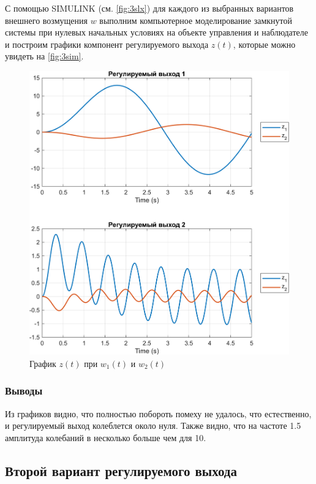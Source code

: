 С помощью SIMULINK (см. \autoref{fig:3slx}) для каждого из выбранных вариантов внешнего возмущения $w$ выполним 
компьютерное моделирование замкнутой системы при нулевых начальных условиях
на объекте управления и наблюдателе и построим графики компонент регулируемого выхода
$z(t)$, которые можно увидеть на \autoref{fig:3sim}.
\begin{figure}[H]
    \centering
    \includegraphics[width=1\linewidth]{figs/3_sim.png}
    \caption{График $z(t)$ при $w_1(t)$ и $w_2(t)$}
    \label{fig:3sim}
\end{figure}

\subsubsection{Выводы}

Из графиков видно, что полностью побороть помеху не удалось, что естественно, и регулируемый выход 
колеблется около нуля. Также видно, что на 
частоте 1.5 амплитуда колебаний  в несколько больше чем для 10.


\subsection{Второй вариант регулируемого выхода}

